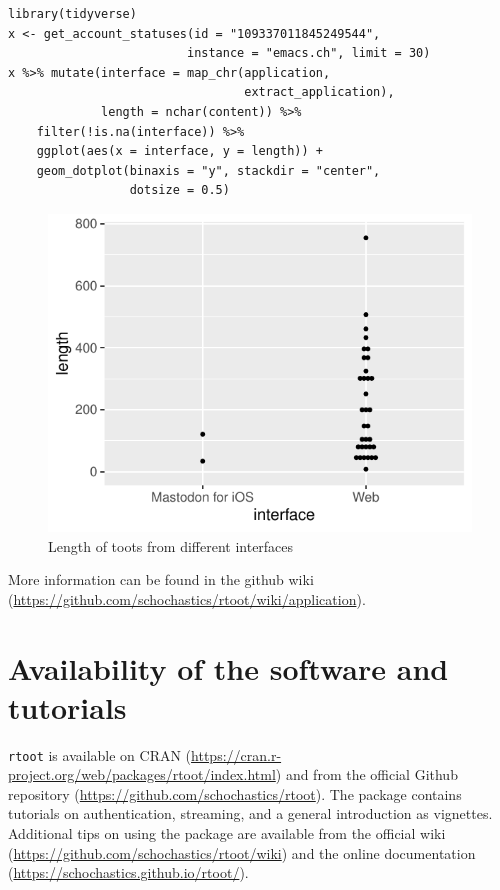 \documentclass[Royal,times,sageh]{sagej}
\begin{document}
\begin{verbatim}
library(tidyverse)
x <- get_account_statuses(id = "109337011845249544",
                         instance = "emacs.ch", limit = 30)
x %>% mutate(interface = map_chr(application,
                                 extract_application), 
             length = nchar(content)) %>%
    filter(!is.na(interface)) %>%
    ggplot(aes(x = interface, y = length)) + 
    geom_dotplot(binaxis = "y", stackdir = "center",
                 dotsize = 0.5)
\end{verbatim}

\begin{figure}
\centering
\includegraphics{fig1.pdf}
\caption{Length of toots from different interfaces}
\end{figure}

More information can be found in the github wiki
(\url{https://github.com/schochastics/rtoot/wiki/application}).

\hypertarget{availability-of-the-software-and-tutorials}{%
\section{Availability of the software and
tutorials}\label{availability-of-the-software-and-tutorials}}

\texttt{rtoot} is available on CRAN
(\url{https://cran.r-project.org/web/packages/rtoot/index.html}) and
from the official Github repository
(\url{https://github.com/schochastics/rtoot}). The package contains
tutorials on authentication, streaming, and a general introduction as
vignettes. Additional tips on using the package are available from the
official wiki (\url{https://github.com/schochastics/rtoot/wiki}) and the
online documentation (\url{https://schochastics.github.io/rtoot/}).



\end{document}
